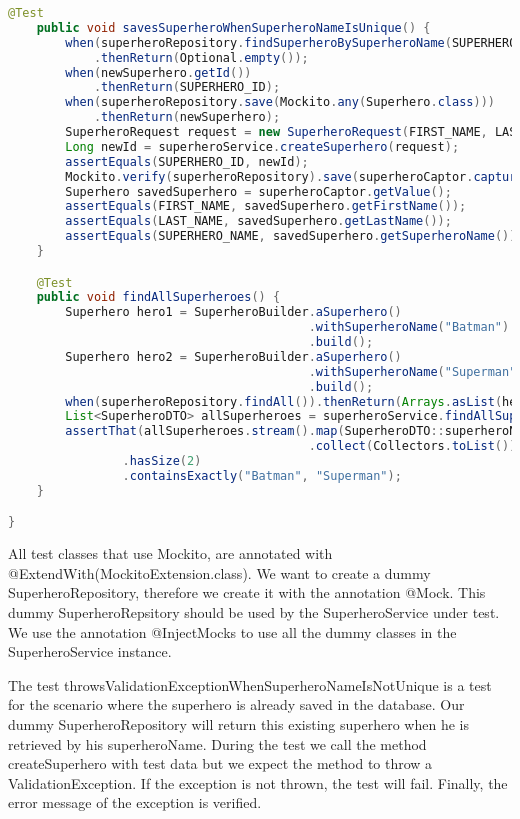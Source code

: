\begin{lstlisting}[frame=single, language=java]
	@Test
	public void savesSuperheroWhenSuperheroNameIsUnique() {
		when(superheroRepository.findSuperheroBySuperheroName(SUPERHERO_NAME))
		    .thenReturn(Optional.empty());
		when(newSuperhero.getId())
		    .thenReturn(SUPERHERO_ID);
		when(superheroRepository.save(Mockito.any(Superhero.class)))
		    .thenReturn(newSuperhero);
		SuperheroRequest request = new SuperheroRequest(FIRST_NAME, LAST_NAME, SUPERHERO_NAME);
		Long newId = superheroService.createSuperhero(request);
		assertEquals(SUPERHERO_ID, newId);
		Mockito.verify(superheroRepository).save(superheroCaptor.capture());
		Superhero savedSuperhero = superheroCaptor.getValue();
		assertEquals(FIRST_NAME, savedSuperhero.getFirstName());
		assertEquals(LAST_NAME, savedSuperhero.getLastName());
		assertEquals(SUPERHERO_NAME, savedSuperhero.getSuperheroName());
	}

	@Test
	public void findAllSuperheroes() {
		Superhero hero1 = SuperheroBuilder.aSuperhero()
		                                  .withSuperheroName("Batman")
		                                  .build();
		Superhero hero2 = SuperheroBuilder.aSuperhero()
		                                  .withSuperheroName("Superman")
		                                  .build();
		when(superheroRepository.findAll()).thenReturn(Arrays.asList(hero1, hero2));
		List<SuperheroDTO> allSuperheroes = superheroService.findAllSuperheroes();
		assertThat(allSuperheroes.stream().map(SuperheroDTO::superheroName)
		                                  .collect(Collectors.toList()))
				.hasSize(2)
				.containsExactly("Batman", "Superman");
	}

}
\end{lstlisting}

All test classes that use Mockito, are annotated with @ExtendWith(MockitoExtension.class).  We want to create a dummy SuperheroRepository, therefore we create it with the annotation @Mock.
This dummy SuperheroRepsitory should be used by the SuperheroService under test.  We use the annotation @InjectMocks to use all the dummy classes in the SuperheroService instance.

The test throwsValidationExceptionWhenSuperheroNameIsNotUnique is a test for the scenario where the superhero is already saved in the database. Our dummy SuperheroRepository will return this existing superhero when he is retrieved by his superheroName.
During the test we call the method createSuperhero with test data but we expect the method to throw a ValidationException.  If the exception is not thrown, the test will fail. Finally, the error message of the exception is verified.

